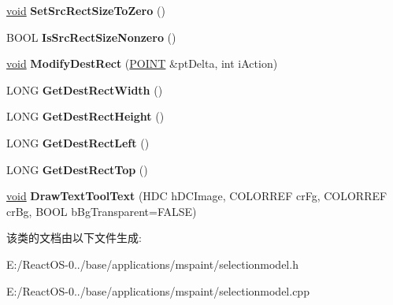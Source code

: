 \begin{DoxyCompactItemize}
\item 
\mbox{\label{class_selection_model_aa2e8fc15345cabd307f720b66f21279f}} 
\hyperlink{interfacevoid}{void} {\bfseries Set\+Src\+Rect\+Size\+To\+Zero} ()
\item 
\mbox{\label{class_selection_model_afe759a7260b7112a12f43cbdb064ea2f}} 
B\+O\+OL {\bfseries Is\+Src\+Rect\+Size\+Nonzero} ()
\item 
\mbox{\label{class_selection_model_af4ac2a73095638abdf4ea7167adcd9c6}} 
\hyperlink{interfacevoid}{void} {\bfseries Modify\+Dest\+Rect} (\hyperlink{structtag_p_o_i_n_t}{P\+O\+I\+NT} \&pt\+Delta, int i\+Action)
\item 
\mbox{\label{class_selection_model_ab33d1128b159caf400805dc79c44a54a}} 
L\+O\+NG {\bfseries Get\+Dest\+Rect\+Width} ()
\item 
\mbox{\label{class_selection_model_aa7847dda084986e2ffe86b0ba7038d2d}} 
L\+O\+NG {\bfseries Get\+Dest\+Rect\+Height} ()
\item 
\mbox{\label{class_selection_model_af88a9157edd1b2a00e8cca02528d9079}} 
L\+O\+NG {\bfseries Get\+Dest\+Rect\+Left} ()
\item 
\mbox{\label{class_selection_model_aea185878d8e267fafcc2e6f1457a2a56}} 
L\+O\+NG {\bfseries Get\+Dest\+Rect\+Top} ()
\item 
\mbox{\label{class_selection_model_a609432605089fe38435faaaa2c34eb95}} 
\hyperlink{interfacevoid}{void} {\bfseries Draw\+Text\+Tool\+Text} (H\+DC h\+D\+C\+Image, C\+O\+L\+O\+R\+R\+EF cr\+Fg, C\+O\+L\+O\+R\+R\+EF cr\+Bg, B\+O\+OL b\+Bg\+Transparent=F\+A\+L\+SE)
\end{DoxyCompactItemize}


该类的文档由以下文件生成\+:\begin{DoxyCompactItemize}
\item 
E\+:/\+React\+O\+S-\/0../base/applications/mspaint/selectionmodel.\+h\item 
E\+:/\+React\+O\+S-\/0../base/applications/mspaint/selectionmodel.\+cpp\end{DoxyCompactItemize}
